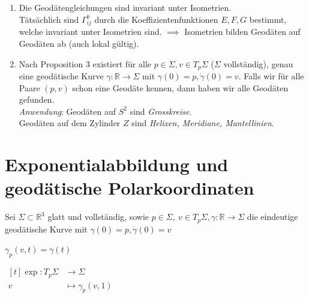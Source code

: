 \documentclass[../main.tex]{subfiles}
\begin{document}
\begin{remarks}
    \leavevmode
    \begin{enumerate}
        \item Die Geodätengleichungen sind invariant unter Isometrien.\\
        Tätsächlich sind $\Gamma^k_{ij}$ durch die Koeffizientenfunktionen $E,F,G$ bestimmt,
        welche invariant unter Isometrien sind.
        $\implies$ Isometrien bilden Geodäten auf Geodäten ab (auch lokal gültig).

        \item Nach Proposition 3 existiert für alle $p \in \Sigma, v\in T_p\Sigma$ ($\Sigma$ vollständig), genau
        eine geodätische Kurve $\gamma : \mathbb{R} \to \Sigma$ mit $\gamma(0)=p, \dot{\gamma}(0)=v$.
        Falls wir für alle Paare $(p,v)$ schon eine Geodäte kennen, dann haben wir alle
        Geodäten gefunden. \\
        \emph{Anwendung}: Geodäten auf $S^2$ sind \emph{Grosskreise}. \\
        Geodäten auf dem Zylinder $Z$ sind \emph{Helixen, Meridiane, Mantellinien}.
    \end{enumerate}
\end{remarks}

\section{Exponentialabbildung und geodätische Polarkoordinaten}

Sei $\Sigma \subset \mathbb{R}^3$ glatt und vollständig, sowie $p\in \Sigma, \ v\in T_p\Sigma,
\gamma : \mathbb{R} \to \Sigma$ die eindeutige geodätische Kurve mit 
$\gamma (0)=p, \dot{\gamma}(0) =v$
\begin{notation} $\gamma_p (v,t) = \gamma(t)$
\end{notation}

\begin{definition}
    $\begin{aligned}[t]
        \exp : T_p\Sigma & \to \Sigma \\
        v & \mapsto \gamma_p(v,1) 
    \end{aligned}$ \qquad
\end{definition}
\end{document}
